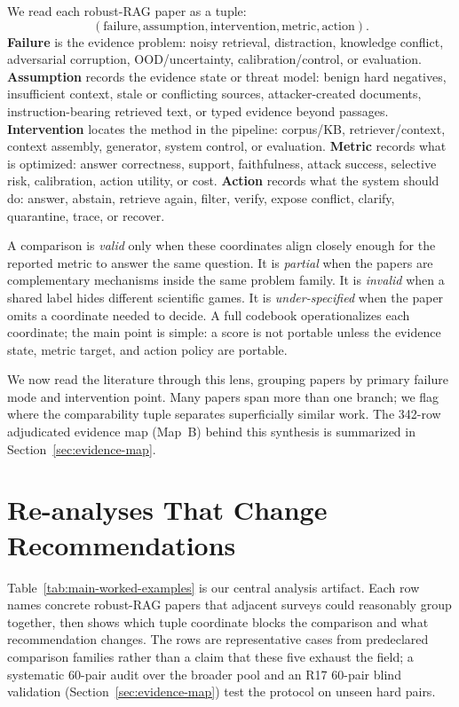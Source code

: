 \documentclass[runningheads]{llncs}
\begin{document}
We read each robust-RAG paper as a tuple:
\[
(\text{failure}, \text{assumption}, \text{intervention}, \text{metric}, \text{action}).
\]
\textbf{Failure} is the evidence problem: noisy retrieval, distraction, knowledge conflict, adversarial corruption, OOD/uncertainty, calibration/control, or evaluation. \textbf{Assumption} records the evidence state or threat model: benign hard negatives, insufficient context, stale or conflicting sources, attacker-created documents, instruction-bearing retrieved text, or typed evidence beyond passages. \textbf{Intervention} locates the method in the pipeline: corpus/KB, retriever/context, context assembly, generator, system control, or evaluation. \textbf{Metric} records what is optimized: answer correctness, support, faithfulness, attack success, selective risk, calibration, action utility, or cost. \textbf{Action} records what the system should do: answer, abstain, retrieve again, filter, verify, expose conflict, clarify, quarantine, trace, or recover.

A comparison is \emph{valid} only when these coordinates align closely enough for the reported metric to answer the same question. It is \emph{partial} when the papers are complementary mechanisms inside the same problem family. It is \emph{invalid} when a shared label hides different scientific games. It is \emph{under-specified} when the paper omits a coordinate needed to decide. A full codebook operationalizes each coordinate; the main point is simple: a score is not portable unless the evidence state, metric target, and action policy are portable.

We now read the literature through this lens, grouping papers by primary failure mode and intervention point. Many papers span more than one branch; we flag where the comparability tuple separates superficially similar work. The 342-row adjudicated evidence map (Map~B) behind this synthesis is summarized in Section~\ref{sec:evidence-map}.



\section{Re-analyses That Change Recommendations}

Table~\ref{tab:main-worked-examples} is our central analysis artifact. Each row names concrete robust-RAG papers that adjacent surveys could reasonably group together, then shows which tuple coordinate blocks the comparison and what recommendation changes. The rows are representative cases from predeclared comparison families rather than a claim that these five exhaust the field; a systematic 60-pair audit over the broader pool and an R17 60-pair blind validation (Section~\ref{sec:evidence-map}) test the protocol on unseen hard pairs.
\end{document}
